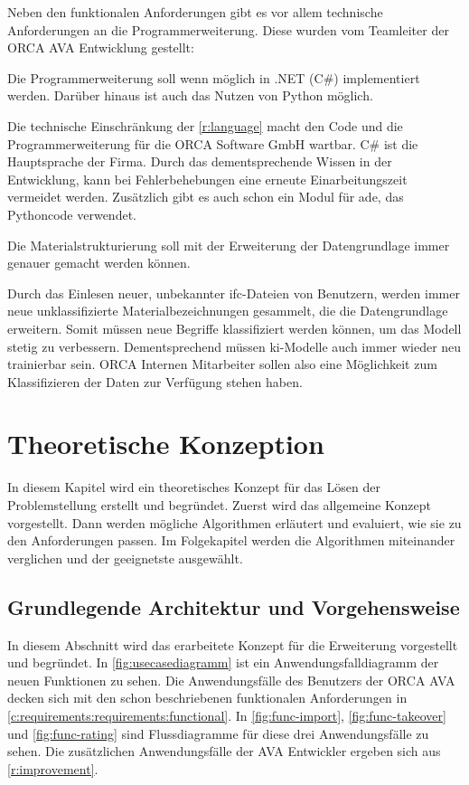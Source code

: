 Neben den funktionalen Anforderungen gibt es vor allem technische Anforderungen an die Programmerweiterung. Diese wurden vom Teamleiter der ORCA AVA Entwicklung gestellt:

\begin{requirement}
	\label{r:language}
	Die Programmerweiterung soll wenn möglich in .NET (C\#) implementiert werden. Darüber hinaus ist auch das Nutzen von Python möglich.
\end{requirement}

Die technische Einschränkung der \autoref{r:language} macht den Code und die Programmerweiterung für die ORCA Software GmbH wartbar. C\# ist die Hauptsprache der Firma. Durch das dementsprechende Wissen in der Entwicklung, kann bei Fehlerbehebungen eine erneute Einarbeitungszeit vermeidet werden. Zusätzlich gibt es auch schon ein Modul für \acf{ade}, das Pythoncode verwendet.

\begin{requirement}
	\label{r:improvement}
	Die Materialstrukturierung soll mit der Erweiterung der Datengrundlage immer genauer gemacht werden können.
\end{requirement}

Durch das Einlesen neuer, unbekannter \ac{ifc}-Dateien von Benutzern, werden immer neue unklassifizierte Materialbezeichnungen gesammelt, die die Datengrundlage erweitern. Somit müssen neue Begriffe klassifiziert werden können, um das Modell stetig zu verbessern. Dementsprechend müssen \ac{ki}-Modelle auch immer wieder neu trainierbar sein. ORCA Internen Mitarbeiter sollen also eine Möglichkeit zum Klassifizieren der Daten zur Verfügung stehen haben.

\chapter{Theoretische Konzeption}
\label{c:conception}
In diesem Kapitel wird ein theoretisches Konzept für das Lösen der Problemstellung erstellt und begründet. Zuerst wird das allgemeine Konzept vorgestellt. Dann werden mögliche Algorithmen erläutert und evaluiert, wie sie zu den Anforderungen passen. Im Folgekapitel werden die Algorithmen miteinander verglichen und der geeignetste ausgewählt.

\section{Grundlegende Architektur und Vorgehensweise}
\label{c:conception:architecture}
In diesem Abschnitt wird das erarbeitete Konzept für die Erweiterung vorgestellt und begründet. In \autoref{fig:usecasediagramm} ist ein Anwendungsfalldiagramm der neuen Funktionen zu sehen. Die Anwendungsfälle des Benutzers der ORCA AVA decken sich mit den schon beschriebenen funktionalen Anforderungen in \autoref{c:requirements:requirements:functional}. In \autoref{fig:func-import}, \ref{fig:func-takeover} und \ref{fig:func-rating} sind Flussdiagramme für diese drei Anwendungsfälle zu sehen. Die zusätzlichen Anwendungsfälle der AVA Entwickler ergeben sich aus \autoref{r:improvement}.

